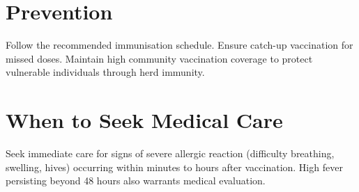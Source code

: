 \section*{Prevention}
Follow the recommended immunisation schedule. Ensure catch-up vaccination for missed doses. Maintain high community vaccination coverage to protect vulnerable individuals through herd immunity.

\section*{When to Seek Medical Care}
Seek immediate care for signs of severe allergic reaction (difficulty breathing, swelling, hives) occurring within minutes to hours after vaccination. High fever persisting beyond 48 hours also warrants medical evaluation.
\clearpage
